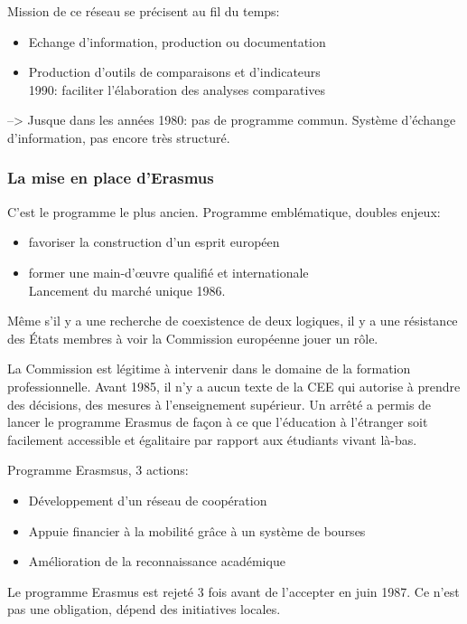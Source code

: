 Mission de ce réseau se précisent au fil du temps:
\begin{itemize}
\item Echange d'information, production ou documentation
\item Production d'outils de comparaisons et d'indicateurs\\
1990: faciliter l'élaboration des analyses comparatives
\end{itemize}

--> Jusque dans les années 1980: pas de programme commun. Système d'échange d'information, pas encore très structuré.
	
	\subsubsection{La mise en place d'Erasmus}

C'est le programme le plus ancien. Programme emblématique, doubles enjeux:
\begin{itemize}
\item favoriser la construction d'un esprit européen
\item former une main-d'œuvre qualifié et internationale\\
Lancement du marché unique 1986.
\end{itemize}

Même s’il y a une recherche de coexistence de deux logiques, il y a une résistance des États membres à voir la Commission européenne jouer un rôle.

La Commission est légitime à intervenir dans le domaine de la formation professionnelle. Avant 1985, il n'y a aucun texte de la CEE qui autorise à prendre des décisions, des mesures à l'enseignement supérieur. Un arrêté a permis de lancer le programme Erasmus de façon à ce que l'éducation à l'étranger soit facilement accessible et égalitaire par rapport aux étudiants vivant là-bas.

Programme Erasmsus, 3 actions:
\begin{itemize}
\item Développement d'un réseau de coopération
\item Appuie financier à la mobilité grâce à un système de bourses
\item Amélioration de la reconnaissance académique
\end{itemize}

Le programme Erasmus est rejeté 3 fois avant de l'accepter en juin 1987. Ce n'est pas une obligation, dépend des initiatives locales.

